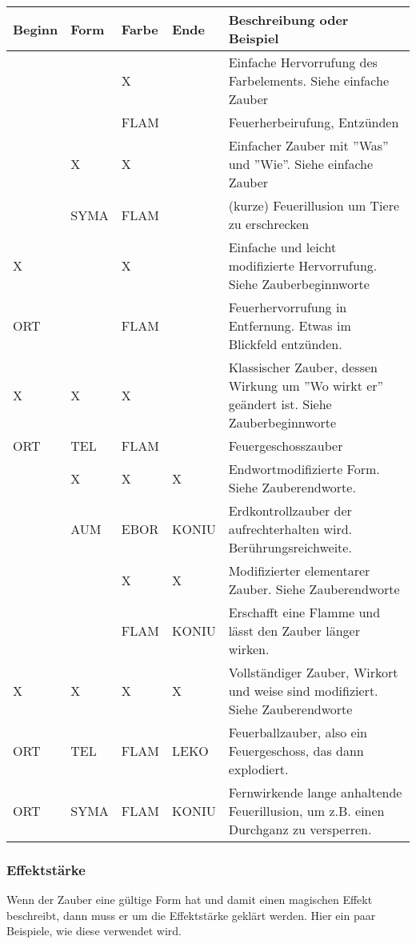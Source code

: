 \documentclass{article}
\begin{document}
\begin{small}
\begin{tabular}{|m{1.3cm}|m{1.3cm}|m{1.3cm}|m{1.3cm}|m{8cm}|}
\hline
\textbf{Beginn}&\textbf{Form}&\textbf{Farbe}&\textbf{Ende}&\textbf{Beschreibung oder Beispiel}\\
\hline
\hline
 & &X& &Einfache Hervorrufung des Farbelements. Siehe einfache Zauber\\
\hline
 & &FLAM& &Feuerherbeirufung, Entzünden\\
\hline
 &X&X& &Einfacher Zauber mit ''Was'' und ''Wie''. Siehe einfache Zauber\\
\hline
 &SYMA&FLAM& &(kurze) Feuerillusion um Tiere zu erschrecken\\
\hline
X& &X& &Einfache und leicht modifizierte Hervorrufung. Siehe Zauberbeginnworte\\
\hline
ORT& &FLAM& &Feuerhervorrufung in Entfernung. Etwas im Blickfeld entzünden.\\
\hline
X&X&X& &Klassischer Zauber, dessen Wirkung um ''Wo wirkt er'' geändert ist. Siehe Zauberbeginnworte\\
\hline
ORT&TEL&FLAM& &Feuergeschosszauber\\
\hline
 &X&X&X&Endwortmodifizierte Form. Siehe Zauberendworte.\\
\hline
 &AUM&EBOR&KONIU&Erdkontrollzauber der aufrechterhalten wird. Berührungsreichweite.\\
\hline
 & &X&X&Modifizierter elementarer Zauber. Siehe Zauberendworte\\
\hline
 & &FLAM&KONIU&Erschafft eine Flamme und lässt den Zauber länger wirken.\\
\hline
X&X&X&X&Vollständiger Zauber, Wirkort und weise sind modifiziert. Siehe Zauberendworte\\
\hline
ORT&TEL&FLAM&LEKO&Feuerballzauber, also ein Feuergeschoss, das dann explodiert.\\
\hline
ORT&SYMA&FLAM&KONIU&Fernwirkende lange anhaltende Feuerillusion, um z.B. einen Durchganz zu versperren.\\
\hline
\end{tabular}
\end{small}

\subsubsection{Effektstärke}

Wenn der Zauber eine gültige Form hat und damit einen magischen Effekt beschreibt, dann muss er um die Effektstärke
geklärt werden. Hier ein paar Beispiele, wie diese verwendet wird.
\end{document}
